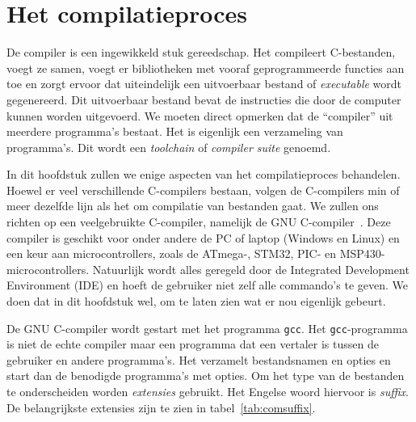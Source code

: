 \chapter{Het compilatieproces}
\label{cha:compilatieproces}
\thispagestyle{empty}

De compiler is een ingewikkeld stuk gereedschap. Het compileert C-bestanden, voegt ze samen, voegt er bibliotheken met vooraf geprogrammeerde functies aan toe en zorgt ervoor dat uiteindelijk een uitvoerbaar bestand of \textsl{executable} wordt gegenereerd. Dit uitvoerbaar bestand bevat de instructies die door de computer kunnen worden uitgevoerd. We moeten direct opmerken dat de ``compiler'' uit meerdere programma's bestaat. Het is eigenlijk een verzameling van programma's. Dit wordt een \textsl{toolchain} of \textsl{compiler suite} genoemd.

In dit hoofdstuk zullen we enige aspecten van het compilatieproces behandelen. Hoewel er veel verschillende C-compilers bestaan, volgen de C-compilers min of meer dezelfde lijn als het om compilatie van bestanden gaat. We zullen ons richten op een veelgebruikte C-compiler, namelijk de GNU C-compiler~\cite{gnugcc}. Deze compiler is geschikt voor onder andere de PC of laptop (Windows en Linux) en een keur aan microcontrollers, zoals de ATmega-, STM32, PIC- en MSP430-microcontrollers. Natuurlijk wordt alles geregeld door de Integrated Development Environment (IDE) en hoeft de gebruiker niet zelf alle commando's te geven. We doen dat in dit hoofdstuk wel, om te laten zien wat er nou eigenlijk gebeurt.


De GNU C-compiler wordt gestart met het programma \texttt{gcc}. Het \texttt{gcc}-programma is niet de echte compiler maar een programma dat een vertaler is tussen de gebruiker en andere programma's. Het verzamelt bestandsnamen en opties en start dan de benodigde programma's met opties.
%
Om het type van de bestanden te onderscheiden worden \textsl{extensies} gebruikt. Het Engelse woord hiervoor is \textsl{suffix}. De belangrijkste extensies zijn te zien in tabel~\ref{tab:comsuffix}.

